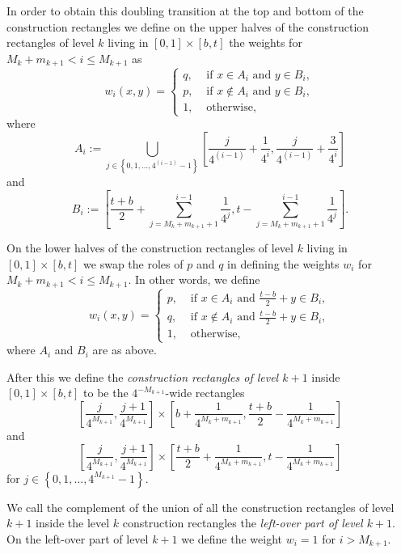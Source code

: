 \documentclass[reqno,12pt]{amsart}
\theoremstyle{plain}
\theoremstyle{remark}
\begin{document}
In order to obtain this doubling transition at the top and bottom of the construction rectangles 
we define on the upper halves of the construction rectangles of level $k$ living in $[0,1] \times [b, t]$ the weights for
$M_k + m_{k+1} < i \le M_{k+1}$ as
\begin{equation*}
  w_i(x,y) = \left\{ \begin{array}{ll}
    q, & \text{ if } x \in A_i \text{ and } y \in B_i, \\
    p, & \text{ if } x \notin A_i \text{ and } y \in B_i,  \\
    1, & \text{ otherwise, }
\end{array}\right.
\end{equation*}
where
\[
 A_i := \bigcup_{j \in \left\{ 0,1,\dots,4^{(i-1)}-1 \right\} }\left[ \frac{j}{ 4^{(i-1)}} + \frac{1}{4^i} ,\frac{j}{ 4^{(i-1)}} + \frac{3}{4^i}\right]
\]
and
\[
 B_i := \left[\frac{t+b}{2} + \sum_{j=M_k+m_{k+1}+1}^{i-1}\frac{1}{4^{j}}, t - \sum_{j=M_k+m_{k+1}+1}^{i-1}\frac{1}{4^{j}} \right].
\]

On the lower halves of the construction rectangles of level $k$ living in $[0,1] \times [b, t]$ we swap the roles of $p$ and $q$ in defining the weights
$w_i$ for $M_k + m_{k+1} < i \le M_{k+1}$. In other words, we define
\begin{equation*}
  w_i(x,y) = \left\{ \begin{array}{ll}
    p, & \text{ if } x \in A_i \text{ and } \frac{t-b}{2} + y \in {B}_i, \\
    q, & \text{ if } x \notin A_i \text{ and } \frac{t-b}{2} + y \in {B}_i,  \\
    1, & \text{ otherwise, }
\end{array}\right.
\end{equation*}
where $A_i$ and $B_i$ are as above.

After this we define the \emph{construction rectangles of level $k+1$} inside $[0,1] \times [b,t]$ to be the
$4^{-M_{k+1}}$-wide rectangles 
\[
 \left[\frac{j}{4^{M_{k+1}}},\frac{j+1}{4^{M_{k+1}}}\right] \times \left[b+\frac1{4^{M_k+m_{k+1}}},\frac{t+b}{2}-\frac1{4^{M_k+m_{k+1}}}\right]
\]
and
\[
 \left[\frac{j}{4^{M_{k+1}}},\frac{j+1}{4^{M_{k+1}}}\right] \times \left[\frac{t+b}{2}+\frac1{4^{M_k+m_{k+1}}},t-\frac1{4^{M_k+m_{k+1}}}\right]
\]
for $j \in \left\{0,1,\dots,4^{M_{k+1}}-1 \right\}$.

We call the complement of the union of all the construction rectangles of level $k+1$ inside the level $k$ construction rectangles
the \emph{left-over part of level $k+1$}.
On the left-over part of level $k+1$ we define the weight $w_i=1$ for $i>M_{k+1}$. 
\end{document}
